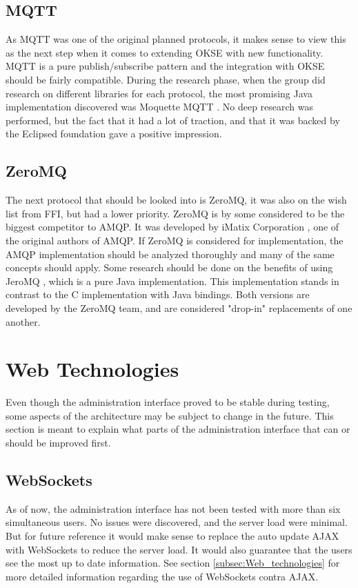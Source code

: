 \subsection{MQTT}
As MQTT was one of the original planned protocols, it makes sense to view this as the next step when it comes to extending OKSE with new functionality. MQTT is a pure publish/subscribe pattern and the integration with OKSE should be fairly compatible. 
During the research phase, when the group did research on different libraries for each protocol, the most promising Java implementation discovered was Moquette MQTT \cite{moquette-mqtt}. No deep research was performed, but the fact that it had a lot of traction, and that it was backed by the Eclipsed foundation gave a positive impression.

\subsection{ZeroMQ}
The next protocol that should be looked into is ZeroMQ, it was also on the wish list from FFI, but had a lower priority. ZeroMQ is by some considered to be the biggest competitor to AMQP. It was developed by iMatix Corporation \cite{imatix}, one of the original authors of AMQP. If ZeroMQ is considered for implementation, the AMQP implementation should be analyzed thoroughly and many of the same concepts should apply. Some research should be done on the benefits of using JeroMQ \cite{jero-mq}, which is a pure Java implementation. This implementation stands in contrast to the C implementation with Java bindings. Both versions are developed by the ZeroMQ team, and are considered "drop-in" replacements of one another.

\section{Web Technologies}
Even though the administration interface proved to be stable during testing, some aspects of the architecture may be subject to change in the future. This section is meant to explain what parts of the administration interface that can or should be improved first. 

\subsection{WebSockets}
As of now, the administration interface has not been tested with more than six simultaneous users. No issues were discovered, and the server load were minimal. But for future reference it would make sense to replace the auto update AJAX with WebSockets to reduce the server load. It would also guarantee that the users see the most up to date information. See section \ref{subsec:Web_technologies} for more detailed information regarding the use of WebSockets contra AJAX.

\clearpage
